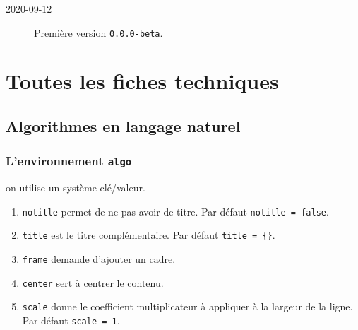 \documentclass[12pt,a4paper]{article}
\theoremstyle{definition}
\begin{document}
\begin{description}

    \medskip
    \item[2020-09-12] Première version \verb+0.0.0-beta+.


\end{description}


\newpage
\section{Toutes les fiches techniques} \label{techincal-ids}





















\subsection{Algorithmes en langage naturel}

\subsubsection{L'environnement \texttt{algo}}




\IDoption{} on utilise un système clé/valeur.
\begin{enumerate}
	\item \verb#notitle# permet de ne pas avoir de titre.
	      Par défaut \verb#notitle = false#.

	\item \verb#title# est le titre complémentaire.
	      Par défaut \verb#title = {}#.

	\item \verb#frame# demande d'ajouter un cadre.

	\item \verb#center# sert à centrer le contenu.

	\item \verb#scale# donne le coefficient multiplicateur à appliquer à la largeur de la ligne.
	      Par défaut \verb#scale = 1#.
\end{enumerate}
\end{document}
